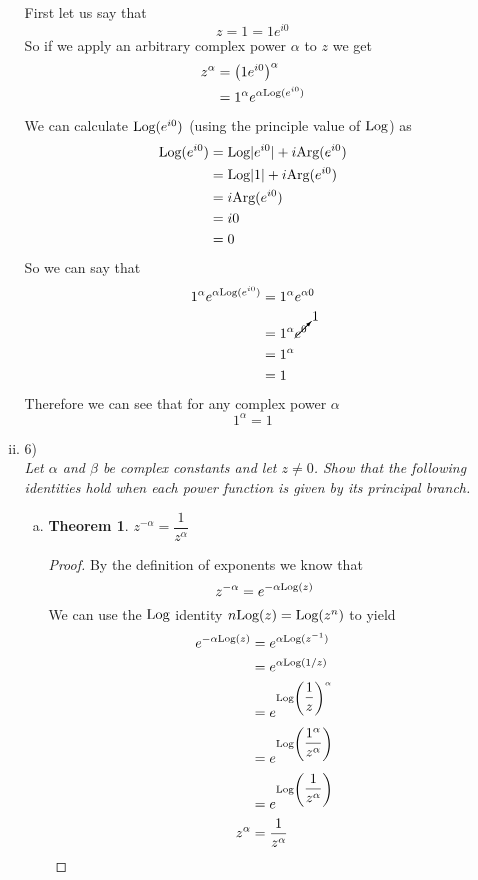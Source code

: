 \documentclass[11pt]{article}
\newcommand{\Arg}{\textnormal{Arg}}
\newcommand{\Log}{\textnormal{Log}}
\begin{document}
\begin{enumerate}
\begin{enumerate}[(i)]
First let us say that
$$z=1= 1e^{i0}$$
So if we apply an arbitrary complex power $\alpha$ to $z$ we get
\begin{align*}
z^{\alpha} &= \left(1e^{i0}\right)^{\alpha}\\
 &= 1^{\alpha}e^{\alpha\Log(e^{i0})}
\end{align*}
We can calculate $\Log(e^{i0})$ (using the principle value of $\Log$) as
\begin{align*}
\Log(e^{i0}) &= \Log|e^{i0}| + i\Arg(e^{i0})\\
 &= \Log|1| + i\Arg(e^{i0})\\
 &= i\Arg(e^{i0})\\
 &= i0\\
 &= 0
\end{align*}
So we can say that 
\begin{align*}
1^{\alpha}e^{\alpha\Log(e^{i0})} &= 1^{\alpha}e^{\alpha0}\\
&= 1^{\alpha}\cancelto{1}{e^{0}}\\
&= 1^{\alpha}\\
&= 1
\end{align*}
Therefore we can see that for any complex power $\alpha$ 
$$1^{\alpha} = 1$$
\item 6)\\
\textit{Let $\alpha$ and $\beta$ be complex constants and let $z\ne 0$. Show that the following identities hold when each power function is given by its principal branch.}
\begin{enumerate}[(a)]
\item 
\newtheorem{theo6a}{Theorem}
\begin{theo6a}
$z^{-\alpha}= \dfrac{1}{z^{\alpha}}$
\end{theo6a}
\begin{proof}
By the definition of exponents we know that
$$z^{-\alpha} = e^{-\alpha\Log(z)} $$
We can use the $\Log$ identity $n\Log(z)=\Log(z^n)$ to yield
\begin{align*}
e^{-\alpha\Log(z)}&= e^{\alpha\Log(z^{-1})} \\
 &= e^{\alpha\Log(1/z)} \\
 &= e^{\Log\left(\dfrac{1}{z}\right)^{\alpha}} \\
 &= e^{\Log\left(\dfrac{1^{\alpha}}{z^{\alpha}}\right)}\\
 &= e^{\Log\left(\dfrac{1}{z^{\alpha}}\right)}\\
z^{\alpha} &= \frac{1}{z^{\alpha}}
\end{align*}
\end{proof}


\end{enumerate}
\end{enumerate}
\end{enumerate}
\end{document}
